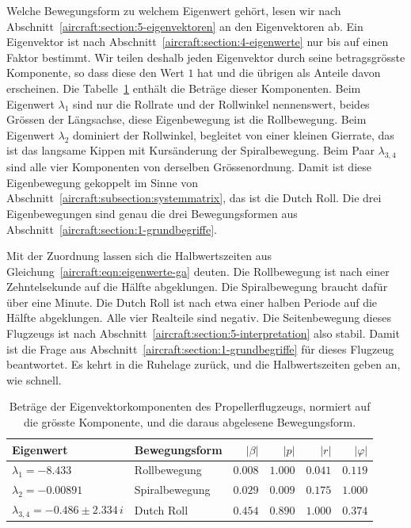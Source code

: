 Welche Bewegungsform zu welchem Eigenwert gehört, lesen wir nach
Abschnitt~\ref{aircraft:section:5-eigenvektoren} an den Eigenvektoren ab.
Ein Eigenvektor ist nach Abschnitt~\ref{aircraft:section:4-eigenwerte} nur bis
auf einen Faktor bestimmt.
Wir teilen deshalb jeden Eigenvektor durch seine betragsgrösste Komponente,
so dass diese den Wert $1$ hat und die übrigen als Anteile davon erscheinen.
Die Tabelle~\ref{aircraft:table:eigenvektoren-ga} enthält die Beträge dieser
Komponenten.
Beim Eigenwert $\lambda_1$ sind nur die Rollrate und der Rollwinkel
nennenswert, beides Grössen der Längsachse, diese Eigenbewegung ist die
Rollbewegung.
Beim Eigenwert $\lambda_2$ dominiert der Rollwinkel, begleitet von einer
kleinen Gierrate, das ist das langsame Kippen mit Kursänderung der
Spiralbewegung.
Beim Paar $\lambda_{3,4}$ sind alle vier Komponenten von derselben
Grössenordnung.
Damit ist diese Eigenbewegung gekoppelt im Sinne von
Abschnitt~\ref{aircraft:subsection:systemmatrix}, das ist die Dutch Roll.
Die drei Eigenbewegungen sind genau die drei Bewegungsformen aus
Abschnitt~\ref{aircraft:section:1-grundbegriffe}.

Mit der Zuordnung lassen sich die Halbwertszeiten aus
Gleichung~\eqref{aircraft:eqn:eigenwerte-ga} deuten.
Die Rollbewegung ist nach einer Zehntelsekunde auf die Hälfte abgeklungen.
Die Spiralbewegung braucht dafür über eine Minute.
Die Dutch Roll ist nach etwa einer halben Periode auf die Hälfte abgeklungen.
Alle vier Realteile sind negativ.
Die Seitenbewegung dieses Flugzeugs ist nach
Abschnitt~\ref{aircraft:section:5-interpretation} also stabil.
Damit ist die Frage aus Abschnitt~\ref{aircraft:section:1-grundbegriffe}
für dieses Flugzeug beantwortet.
Es kehrt in die Ruhelage zurück, und die Halbwertszeiten geben an, wie
schnell.

\begin{table}
    \centering
    \begin{tabular}{llrrrr}
        \hline
        Eigenwert & Bewegungsform & $|\beta|$ & $|p|$ & $|r|$ & $|\varphi|$ \\
        \hline
        $\lambda_1 = -8.433$                  & Rollbewegung
        & $0.008$ & $1.000$ & $0.041$ & $0.119$ \\
        $\lambda_2 = -0.00891$                & Spiralbewegung
        & $0.029$ & $0.009$ & $0.175$ & $1.000$ \\
        $\lambda_{3,4} = -0.486 \pm 2.334\,i$ & Dutch Roll
        & $0.454$ & $0.890$ & $1.000$ & $0.374$ \\
        \hline
    \end{tabular}
    \caption{Beträge der Eigenvektorkomponenten des Propellerflugzeugs,
        normiert auf die grösste Komponente, und die daraus abgelesene
        Bewegungsform.
        \label{aircraft:table:eigenvektoren-ga}}
\end{table}

